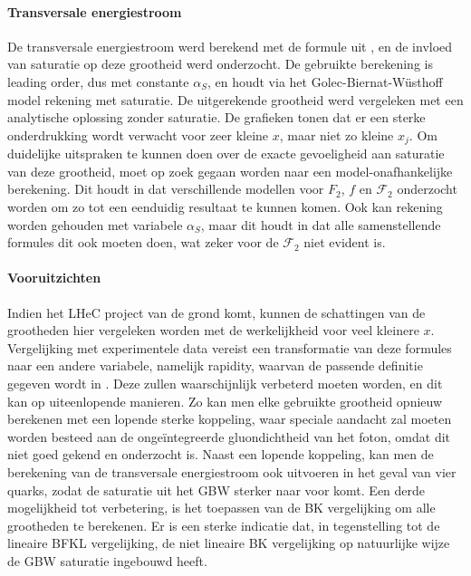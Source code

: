 \documentclass[a4paper,11pt]{article}
\numberwithin{equation}{section} %
\begin{document}
      \paragraph{Transversale energiestroom}
De transversale energiestroom werd berekend met de formule uit \cite{ET}, en de invloed van saturatie op deze grootheid werd onderzocht.
De gebruikte berekening is leading order, dus met constante $\alpha_S$, en houdt via het Golec-Biernat-Wüsthoff model rekening met saturatie.
De uitgerekende grootheid werd vergeleken met een analytische oplossing zonder saturatie.
De grafieken tonen dat er een sterke onderdrukking wordt verwacht voor zeer kleine $x$, maar niet zo kleine $x_j$.
Om duidelijke uitspraken te kunnen doen over de exacte gevoeligheid aan saturatie van deze grootheid, moet op zoek gegaan worden naar een model-onafhankelijke berekening.
Dit houdt in dat verschillende modellen voor $F_2$, $f$ en $\mathcal{F}_2$ onderzocht worden om zo tot een eenduidig resultaat te kunnen komen.
Ook kan rekening worden gehouden met variabele $\alpha_S$, maar dit houdt in dat alle samenstellende formules dit ook moeten doen, wat zeker voor de $\mathcal{F}_2$ niet evident is.

      \paragraph{Vooruitzichten}
Indien het LHeC project van de grond komt, kunnen de schattingen van de grootheden hier vergeleken worden met de werkelijkheid voor veel kleinere $x$.
Vergelijking met experimentele data vereist een transformatie van deze formules naar een andere variabele, namelijk rapidity, waarvan de passende definitie gegeven wordt in \cite{ET}.
Deze zullen waarschijnlijk verbeterd moeten worden, en dit kan op uiteenlopende manieren.
Zo kan men elke gebruikte grootheid opnieuw berekenen met een lopende sterke koppeling, waar speciale aandacht zal moeten worden besteed aan de ongeïntegreerde gluondichtheid van het foton, omdat dit niet goed gekend en onderzocht is.
Naast een lopende koppeling, kan men de berekening van de transversale energiestroom ook uitvoeren in het geval van vier quarks, zodat de saturatie uit het GBW sterker naar voor komt.
Een derde mogelijkheid tot verbetering, is het toepassen van de BK vergelijking om alle grootheden te berekenen.
Er is een sterke indicatie \cite{Kutak} dat, in tegenstelling tot de lineaire BFKL vergelijking, de niet lineaire BK vergelijking op natuurlijke wijze de GBW saturatie ingebouwd heeft.
\end{document}
